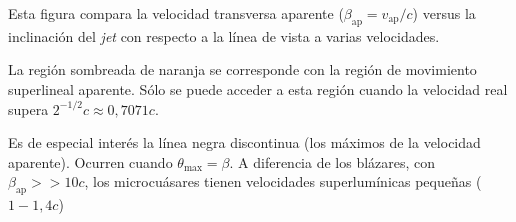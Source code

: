 \noindent Esta figura compara la velocidad transversa aparente ($\beta_{\mbox{ap}}=v_{\mbox{ap}}/c$) versus la inclinación del \textit{jet} con respecto a la línea de vista a varias velocidades.

La región sombreada de naranja se corresponde con la región de movimiento superlineal aparente. Sólo se puede acceder a esta región cuando la velocidad real supera $2^{-1/2}c\approx 0,7071c$. 

Es de especial interés la línea negra discontinua (los máximos de la velocidad aparente). Ocurren cuando $\theta_{\max}=\beta$. A diferencia de los blázares, con $\beta_{\mbox{ap}}>>10c$, los microcuásares tienen velocidades superlumínicas pequeñas ($1-1,4c$)
